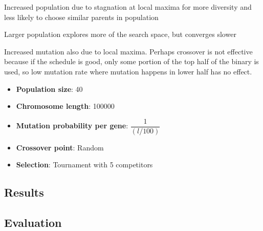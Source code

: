 \documentclass{article}
\begin{document}
Increased population due to stagnation at local maxima for more diversity and less likely to choose similar parents in population

Larger population explores more of the search space, but converges slower

Increased mutation also due to local maxima. Perhaps crossover is not effective because if the schedule is good, only some portion of the top half of the binary is used, so low mutation rate where mutation happens in lower half has no effect.
\begin{itemize}
\item \textbf{Population size}: 40
\item \textbf{Chromosome length}: 100000
\item \textbf{Mutation probability per gene}: $\dfrac{1}{(l/100)}$
\item \textbf{Crossover point}: Random
\item \textbf{Selection}: Tournament with 5 competitors
\end{itemize}


\subsection{Results}

\subsection{Evaluation}

\printbibliography
\end{document}
